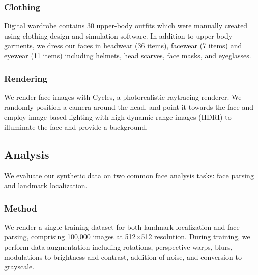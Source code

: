 \documentclass[12pt]{article}
\begin{document}
\subsubsection{Clothing}
Digital wardrobe
contains 30 upper-body outfits which were manually created
using clothing design and simulation software. In addition to upper-body garments, we
dress our faces in headwear (36 items), facewear (7 items)
and eyewear (11 items) including helmets, head scarves, face
masks, and eyeglasses.
\subsubsection{Rendering}
We render face images with Cycles, a photorealistic raytracing renderer. We randomly position a camera around
the head, and point it towards the face and  employ image-based lighting with high dynamic range images (HDRI) to illuminate the face and
provide a background.
\subsection{Analysis}
We evaluate our synthetic data on two common face analysis tasks: face parsing and landmark localization.
\subsubsection{Method}
We render a single training dataset for both landmark
localization and face parsing, comprising 100,000 images at
512×512 resolution. During training, we perform data augmentation including
rotations, perspective warps, blurs, modulations to brightness
and contrast, addition of noise, and conversion to grayscale.
\end{document}

